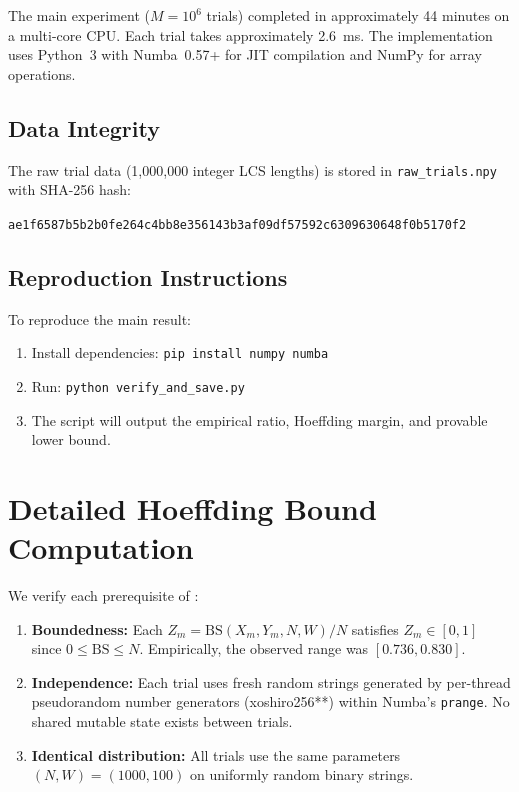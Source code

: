 \documentclass[11pt,a4paper]{article}
\theoremstyle{definition}
\newcommand{\BS}{\mathrm{BS}}
\begin{document}
The main experiment ($M = 10^6$ trials) completed in approximately 44 minutes
on a multi-core CPU. Each trial takes approximately 2.6~ms. The implementation
uses Python~3 with Numba~0.57+ for JIT compilation and NumPy for array
operations.

\subsection{Data Integrity}

The raw trial data (1,000,000 integer LCS lengths) is stored in
\texttt{raw\_trials.npy} with SHA-256 hash:
\begin{center}
  \texttt{ae1f6587b5b2b0fe264c4bb8e356143b3af09df57592c6309630648f0b5170f2}
\end{center}

\subsection{Reproduction Instructions}

To reproduce the main result:
\begin{enumerate}
  \item Install dependencies: \texttt{pip install numpy numba}
  \item Run: \texttt{python verify\_and\_save.py}
  \item The script will output the empirical ratio, Hoeffding margin, and
    provable lower bound.
\end{enumerate}

\section{Detailed Hoeffding Bound Computation}
\label{app:hoeffding}

We verify each prerequisite of :

\begin{enumerate}
  \item \textbf{Boundedness:} Each $Z_m = \BS(X_m, Y_m, N, W) / N$ satisfies
    $Z_m \in [0, 1]$ since $0 \leq \BS \leq N$. Empirically, the observed
    range was $[0.736, 0.830]$.

  \item \textbf{Independence:} Each trial uses fresh random strings generated
    by per-thread pseudorandom number generators (xoshiro256**) within Numba's
    \texttt{prange}. No shared mutable state exists between trials.

  \item \textbf{Identical distribution:} All trials use the same parameters
    $(N, W) = (1000, 100)$ on uniformly random binary strings.
\end{enumerate}
\end{document}
